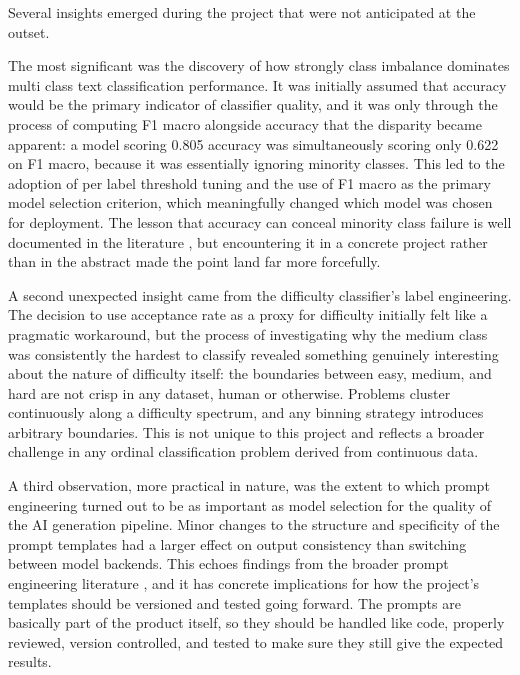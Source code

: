 Several insights emerged during the project that were not anticipated
at the outset.

The most significant was the discovery of how strongly class imbalance
dominates multi class text classification performance. It was initially
assumed that accuracy would be the primary indicator of classifier
quality, and it was only through the process of computing F1 macro
alongside accuracy that the disparity became apparent: a model scoring
0.805 accuracy was simultaneously scoring only 0.622 on F1 macro,
because it was essentially ignoring minority classes. This led to the
adoption of per label threshold tuning and the use of F1 macro as the
primary model selection criterion, which meaningfully changed which
model was chosen for deployment. The lesson that accuracy can conceal
minority class failure is well documented in the literature
\cite{japkowicz2002imbalance}, but encountering it in a concrete
project rather than in the abstract made the point land far more
forcefully.

A second unexpected insight came from the difficulty classifier's
label engineering. The decision to use acceptance rate as a proxy for
difficulty initially felt like a pragmatic workaround, but the process
of investigating why the medium class was consistently the hardest to
classify revealed something genuinely interesting about the nature of
difficulty itself: the boundaries between easy, medium, and hard are
not crisp in any dataset, human or otherwise. Problems cluster
continuously along a difficulty spectrum, and any binning strategy
introduces arbitrary boundaries. This is not unique to this project
and reflects a broader challenge in any ordinal classification problem
derived from continuous data.

A third observation, more practical in nature, was the extent to which
prompt engineering turned out to be as important as model selection for
the quality of the AI generation pipeline. Minor changes to the
structure and specificity of the prompt templates had a larger effect
on output consistency than switching between model backends. This
echoes findings from the broader prompt engineering literature
\cite{liu2023promptsurvey,wei2022chainofthought}, and it has concrete
implications for how the project's templates should be versioned and
tested going forward. The prompts are basically part of the product itself, so they should be handled like code, properly reviewed, version controlled, and tested to make sure they still give the expected results.

